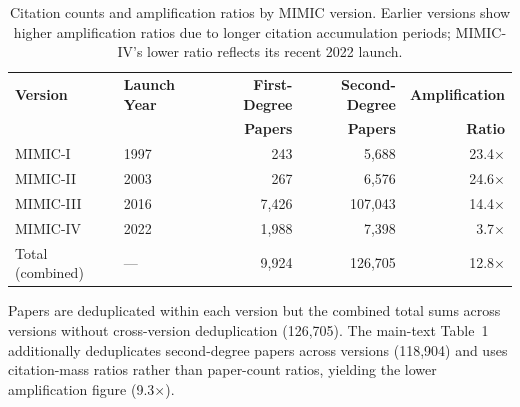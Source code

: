 \documentclass[11pt]{article}
\begin{document}
\begin{table}[H]
\centering
\caption{Citation counts and amplification ratios by MIMIC version. Earlier versions show higher amplification ratios due to longer citation accumulation periods; MIMIC-IV's lower ratio reflects its recent 2022 launch.}
\label{etab:mimicversions}
\small
\begin{tabular}{@{}llrrr@{}}
\toprule
\textbf{Version} & \textbf{Launch Year} & \textbf{First-Degree} & \textbf{Second-Degree} & \textbf{Amplification} \\
& & \textbf{Papers} & \textbf{Papers} & \textbf{Ratio} \\
\midrule
MIMIC-I & 1997 & 243 & 5,688 & 23.4$\times$ \\
MIMIC-II & 2003 & 267 & 6,576 & 24.6$\times$ \\
MIMIC-III & 2016 & 7,426 & 107,043 & 14.4$\times$ \\
MIMIC-IV & 2022 & 1,988 & 7,398 & 3.7$\times$ \\
\midrule
Total (combined) & --- & 9,924 & 126,705 & 12.8$\times$ \\
\bottomrule
\end{tabular}

\vspace{4pt}
{\footnotesize Papers are deduplicated within each version but the combined total sums across versions without cross-version deduplication (126,705). The main-text Table~1 additionally deduplicates second-degree papers across versions (118,904) and uses citation-mass ratios rather than paper-count ratios, yielding the lower amplification figure (9.3$\times$).}
\end{table}
\end{document}
